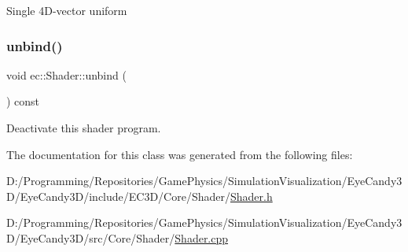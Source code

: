 Single 4\+D-\/vector uniform \mbox{\label{classec_1_1_shader_a4d3730787deb6b28d59fc8b6486e5cb3}} 
\subsubsection{\texorpdfstring{unbind()}{unbind()}}
{\footnotesize\ttfamily void ec\+::\+Shader\+::unbind (\begin{DoxyParamCaption}{ }\end{DoxyParamCaption}) const}

Deactivate this shader program. 

The documentation for this class was generated from the following files\+:\begin{DoxyCompactItemize}
\item 
D\+:/\+Programming/\+Repositories/\+Game\+Physics/\+Simulation\+Visualization/\+Eye\+Candy3\+D/\+Eye\+Candy3\+D/include/\+E\+C3\+D/\+Core/\+Shader/\mbox{\hyperlink{_shader_8h}{Shader.\+h}}\item 
D\+:/\+Programming/\+Repositories/\+Game\+Physics/\+Simulation\+Visualization/\+Eye\+Candy3\+D/\+Eye\+Candy3\+D/src/\+Core/\+Shader/\mbox{\hyperlink{_shader_8cpp}{Shader.\+cpp}}\end{DoxyCompactItemize}

